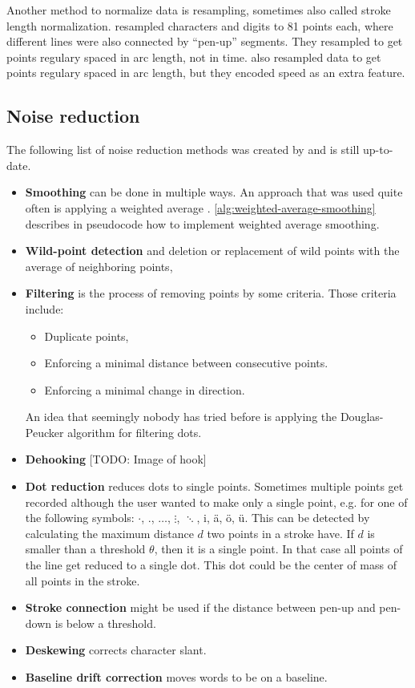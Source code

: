 Another method to normalize data is resampling, sometimes also called
stroke length normalization.
\cite{Guyon91} resampled characters and digits to 81 points each, where different
lines were also connected by \enquote{pen-up} segments. They resampled to get
points regulary spaced in arc length, not in time. \cite{ICASSP-94} also
resampled data to get points regulary spaced in arc length, but they encoded
speed as an extra feature.

\subsection{Noise reduction}
The following list of noise reduction methods was created by \cite{Tappert90}
and is still up-to-date.\nopagebreak
\begin{itemize}
    \item \textbf{Smoothing} can be done in multiple ways. An approach that was
          used quite often is applying a weighted average
          \cite{Groner66,Division87,Arakaw83}. \cref{alg:weighted-average-smoothing}
          describes in pseudocode how to implement weighted average smoothing.
    \item \textbf{Wild-point detection} and deletion or replacement of 
          wild points with the average of neighboring points\cite{Division87},
    \item \textbf{Filtering} is the process of removing points by some criteria.
          Those criteria include:
          \begin{itemize}
              \item Duplicate points,
              \item Enforcing a minimal distance between consecutive 
                    points\cite{Tappert90}.
              \item Enforcing a minimal change in direction\cite{Tappert90}.
          \end{itemize}
          An idea that seemingly nobody has tried before is applying the
          Douglas-Peucker algorithm for filtering dots.
    \item \textbf{Dehooking} [TODO: Image of hook]
    \item \textbf{Dot reduction} reduces dots to single points. Sometimes
          multiple points get recorded although the user wanted to make only
          a single point, e.g. for one of the following symbols:
          $\cdot$, ., $\dots$, $\vdots$, $\ddots$, i, ä, ö, ü.
          This can be detected by calculating
          the maximum distance $d$ two points in a stroke have. If $d$ is
          smaller than a threshold $\theta$, then it is a single point.
          In that case all points of the line get reduced to a single dot.
          This dot could be the center of mass of all points in the stroke.
    \item \textbf{Stroke connection} might be used if the distance between
          pen-up and pen-down is below a threshold.
    \item \textbf{Deskewing} corrects character slant.
    \item \textbf{Baseline drift correction} moves words to be on a baseline.
\end{itemize}

